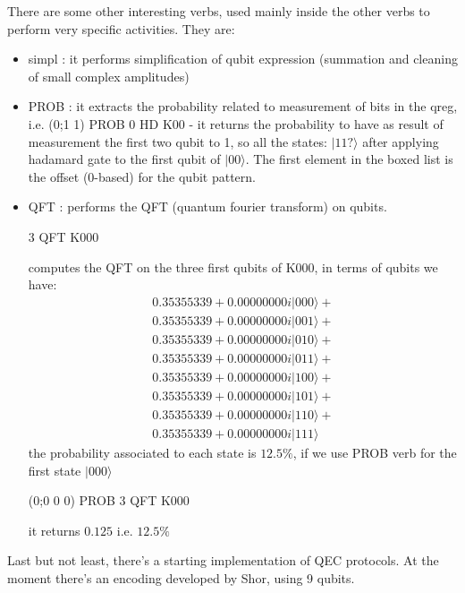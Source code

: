 \documentclass[a4paper,11pt]{amsbook}
\begin{document}
There are some other interesting verbs, used mainly inside the other verbs to 
perform very specific activities. They are:
\begin{itemize}
\item simpl : it performs simplification of qubit expression (summation and cleaning of small complex amplitudes)
\item PROB : it extracts the probability related to measurement of bits in the qreg, i.e. (0;1 1) PROB 0 HD K00 - it returns the probability to have as result of measurement the first two qubit to 1, so all the states: $|11?\rangle$ after applying hadamard gate to the first qubit of $|00\rangle$. The first element in the boxed list is the offset (0-based) for the qubit pattern.
\item QFT : performs the QFT (quantum fourier transform) on qubits. 
\begin{center}
 3 QFT K000
\end{center} computes the QFT on the three first qubits of K000, in terms of qubits we have:
\[
\begin{array}{l}
0.35355339+0.00000000i |000\rangle +  \\
0.35355339+0.00000000i |001\rangle +  \\
0.35355339+0.00000000i |010\rangle +  \\
0.35355339+0.00000000i |011\rangle +  \\
0.35355339+0.00000000i |100\rangle +  \\
0.35355339+0.00000000i |101\rangle +  \\
0.35355339+0.00000000i |110\rangle +  \\
0.35355339+0.00000000i |111\rangle
\end{array}
\]
the probability associated to each state is $12.5\%$, if we use PROB verb for the first state $|000\rangle$
\begin{center}
(0;0 0 0) PROB 3 QFT K000
\end{center}
it returns $0.125$ i.e. $12.5\%$
\end{itemize}

Last but not least, there's a starting implementation of QEC protocols.
At the moment there's an encoding developed by Shor, using 9 qubits.
\end{document}
